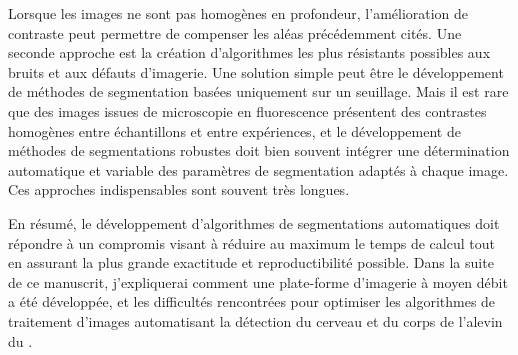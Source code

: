 \documentclass[\main/main.tex]{subfiles}
\begin{document}
%
Lorsque les images ne sont pas homogènes en profondeur, l'amélioration de contraste peut permettre de compenser les aléas précédemment cités.
%
Une seconde approche est la création d'algorithmes les plus résistants possibles aux bruits et aux défauts d'imagerie.
Une solution simple peut être le développement de méthodes de segmentation basées uniquement sur un seuillage.
%
 Mais il est rare que des images issues de microscopie en fluorescence présentent des contrastes homogènes entre échantillons et entre expériences, et le développement de méthodes de segmentations robustes doit bien souvent intégrer une détermination automatique et variable des paramètres de segmentation adaptés à chaque image.
 Ces approches indispensables sont souvent très longues.
 
 En résumé, le développement d'algorithmes de segmentations automatiques doit répondre à un compromis visant à réduire au maximum le temps de calcul tout en assurant la plus grande exactitude et reproductibilité possible.
%
Dans la suite de ce manuscrit, j'expliquerai comment une plate-forme d'imagerie à moyen débit a été développée, et les difficultés rencontrées pour optimiser les algorithmes de traitement d'images automatisant la détection du cerveau et du corps de l'alevin du \pz{}.
\end{document}
